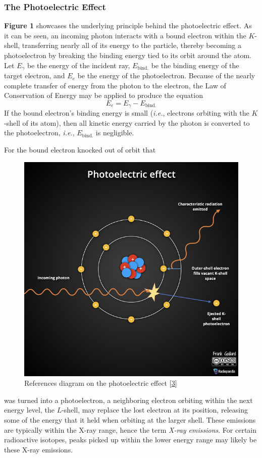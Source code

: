 \documentclass[12pt]{article}
\begin{document}
\begin{multicols}{2}
\subsubsection{The Photoelectric Effect}
\textbf{Figure 1} showcases the underlying principle behind
the photoelectric effect. As it can be seen, an incoming photon
interacts with a bound electron within the $K$-shell,
transferring nearly all of its energy to the particle,
thereby becoming a photoelectron by breaking the binding
energy tied to its orbit around the atom. Let $E_\gamma$ be the
energy of the incident ray, $E_\text{bind.}$ be the binding energy
of the target electron, and $E_e$ be the energy of the photoelectron.
Because of the nearly complete transfer of energy from the photon to
the electron, the Law of Conservation of Energy may be applied to produce the
equation
$$E_e=E_\gamma-E_\text{bind.}$$
If the bound electron's binding energy is small (\textit{i.e.}, electrons
orbiting with the $K$-shell of its atom), then all kinetic energy carried
by the photon is converted to the photoelectron, \textit{i.e.}, $E_\text{bind.}$
is negligible.

For the bound electron knocked out of orbit that
\begin{figure}[H]
    \centering
    \includegraphics[width=0.98\linewidth]{figs/fig1.jpeg}
    \caption{
        References diagram on the photoelectric effect [\hyperref[sec:3]{3}]
    }
\end{figure}
\noindent
was turned into a photoelectron,
a neighboring electron orbiting within the next energy level, the $L$-shell, may
replace the lost electron at its position, releasing some of the energy that
it held when orbiting at the larger shell. These emissions are typically within
the X-ray range, hence the term \textit{X-ray emissions}. For certain radioactive
isotopes, peaks picked up within the lower energy range may likely be these X-ray
emissions.


\end{multicols}
\end{document}

